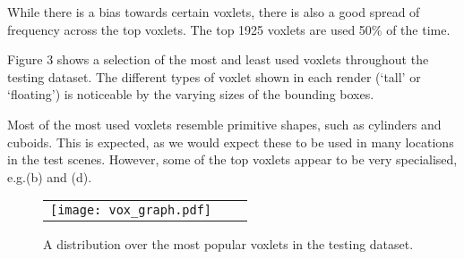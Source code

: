 \documentclass[10pt,onecolumn,letterpaper]{article}
\makeatletter
\renewcommand*{\eg}{e.g.\@\xspace}
\makeatother
\begin{document}
While there is a bias towards certain voxlets, there is also a good spread of frequency across the top voxlets.
The top 1925 voxlets are used 50\% of the time.

Figure 3 shows a selection of the most and least used voxlets throughout the testing dataset.
The different types of voxlet shown in each render (`tall' or `floating') is noticeable by the varying sizes of the bounding boxes.

Most of the most used voxlets resemble primitive shapes, such as cylinders and cuboids.
This is expected, as we would expect these to be used in many locations in the test scenes.
However, some of the top voxlets appear to be very specialised, \eg (b) and (d).


\begin{figure*}[h!]
\begin{center}
\begin{tabular}{ccc}
    \texttt{[image: vox\_graph.pdf]}
\end{tabular}
\end{center}
\vspace{5pt}
\caption{\small A distribution over the most popular voxlets in the testing dataset.}
\label{fig:voxpop}
\end{figure*}
\end{document}
